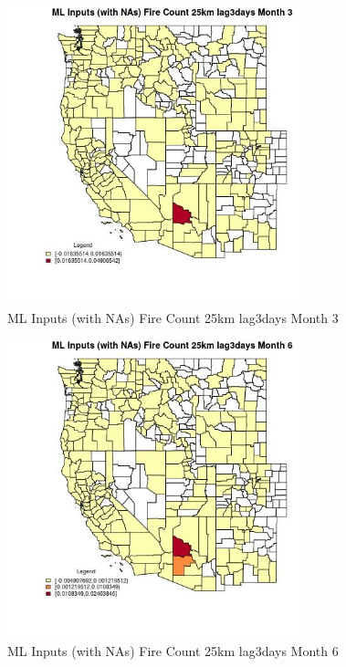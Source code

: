 \begin{figure} 
\centering  
\includegraphics[width=0.77\textwidth]{Code_Outputs/Report_ML_input_PM25_Step4_part_e_de_duplicated_aves_compiled_2019-05-20wNAs_CountyFire_Count_25km_lag3daysmedianMonth3.jpg} 
\caption{\label{fig:Report_ML_input_PM25_Step4_part_e_de_duplicated_aves_compiled_2019-05-20wNAsCountyFire_Count_25km_lag3daysmedianMonth3}ML Inputs (with NAs) Fire Count 25km lag3days Month 3} 
\end{figure} 
 

\begin{figure} 
\centering  
\includegraphics[width=0.77\textwidth]{Code_Outputs/Report_ML_input_PM25_Step4_part_e_de_duplicated_aves_compiled_2019-05-20wNAs_CountyFire_Count_25km_lag3daysmedianMonth6.jpg} 
\caption{\label{fig:Report_ML_input_PM25_Step4_part_e_de_duplicated_aves_compiled_2019-05-20wNAsCountyFire_Count_25km_lag3daysmedianMonth6}ML Inputs (with NAs) Fire Count 25km lag3days Month 6} 
\end{figure} 
 

